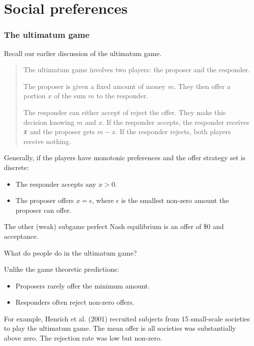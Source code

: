 \documentclass[
  letterpaper,
  DIV=11,
  numbers=noendperiod]{scrreprt}
\begin{document}
\part{Social preferences}

\hypertarget{the-ultimatum-game-1}{%
\section*{The ultimatum game}\label{the-ultimatum-game-1}}


Recall our earlier discussion of the ultimatum game.

\begin{quote}
The ultimatum game involves two players: the proposer and the responder.

The proposer is given a fixed amount of money \(m\). They then offer a
portion \(x\) of the sum \(m\) to the responder.

The responder can either accept of reject the offer. They make this
decision knowing \(m\) and \(x\). If the responder accepts, the
responder receives 𝑥 and the proposer gets \(m-x\). If the responder
rejects, both players receive nothing.
\end{quote}

Generally, if the players have monotonic preferences and the offer
strategy set is discrete:

\begin{itemize}
\item
  The responder accepts any \(x>0\).
\item
  The proposer offers \(x=\epsilon\), where \(\epsilon\) is the smallest
  non-zero amount the proposer can offer.
\end{itemize}

The other (weak) subgame perfect Nash equilibrium is an offer of \$0 and
acceptance.

What do people do in the ultimatum game?

Unlike the game theoretic predictions:

\begin{itemize}
\item
  Proposers rarely offer the minimum amount.
\item
  Responders often reject non-zero offers.
\end{itemize}

For example, Henrich et al. (2001) recruited subjects from 15
small-scale societies to play the ultimatum game. The mean offer is all
societies was substantially above zero. The rejection rate was low but
non-zero.
\end{document}
